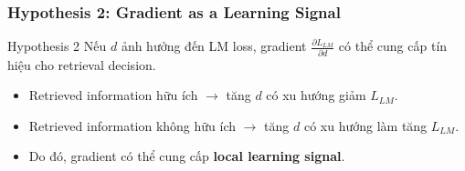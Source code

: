 \begin{frame}
    \frametitle{Hypothesis 2: Gradient as a Learning Signal}

    \small

    \begin{block}{Hypothesis 2}
        Nếu $d$ ảnh hưởng đến LM loss, gradient
        $\frac{\partial L_{LM}}{\partial d}$ có thể cung cấp
        tín hiệu cho retrieval decision.
    \end{block}

    \vspace{0.3cm}

    \begin{center}
    \end{center}

    \vspace{0.3cm}

    \begin{itemize}
        \item Retrieved information hữu ích
        $\rightarrow$ tăng $d$ có xu hướng giảm $L_{LM}$.

        \item Retrieved information không hữu ích
        $\rightarrow$ tăng $d$ có xu hướng làm tăng $L_{LM}$.

        \item Do đó, gradient có thể cung cấp
        \textbf{local learning signal}.
    \end{itemize}

\end{frame}


